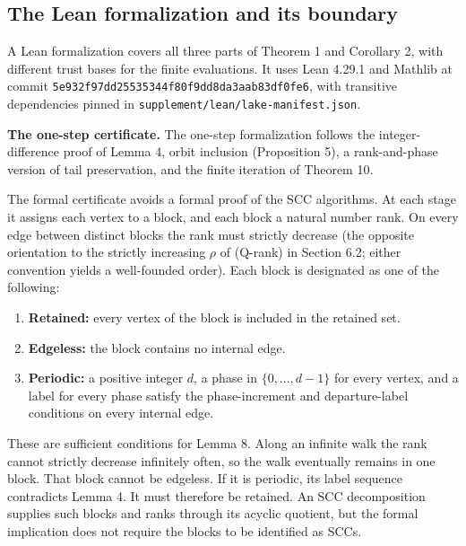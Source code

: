 \documentclass[11pt,reqno]{amsart}
\theoremstyle{definition}
\theoremstyle{remark}
\providecommand{\tightlist}{\setlength{\itemsep}{0pt}\setlength{\parskip}{0pt}}
\begin{document}
\subsection{The Lean formalization and its boundary}\label{sec:9.4}

A Lean formalization covers all three parts of Theorem 1 and Corollary 2,
with different trust bases for the finite evaluations. It uses
Lean 4.29.1 and Mathlib at commit
\nolinkurl{5e932f97dd25535344f80f9dd8da3aab83df0fe6}, with transitive dependencies
pinned in \nolinkurl{supplement/lean/lake-manifest.json}.

\textbf{The one-step certificate.} The one-step formalization follows the
integer-difference proof of Lemma 4, orbit inclusion (Proposition 5), a
rank-and-phase version of tail preservation, and the finite iteration of
Theorem 10.

The formal certificate avoids a formal proof of the SCC algorithms. At
each stage it assigns each vertex to a block, and each block a natural
number rank. On every edge between distinct blocks the rank must strictly
decrease (the opposite orientation to the strictly increasing \(\rho\) of
(Q-rank) in Section 6.2; either convention yields a well-founded order).
Each block is designated as one of the following:

\begin{enumerate}
\def\labelenumi{\arabic{enumi}.}
\tightlist
\item
  \textbf{Retained:} every vertex of the block is included in the retained set.
\item
  \textbf{Edgeless:} the block contains no internal edge.
\item
  \textbf{Periodic:} a positive integer \(d\), a phase in
  \(\{0,\ldots,d-1\}\) for every vertex, and a label for every phase
  satisfy the phase-increment and departure-label conditions on every
  internal edge.
\end{enumerate}

These are sufficient conditions for Lemma 8. Along an infinite walk the
rank cannot strictly decrease infinitely often, so the walk eventually
remains in one block. That block cannot be edgeless. If it is periodic,
its label sequence contradicts Lemma 4. It must therefore be retained.
An SCC decomposition supplies such blocks and ranks through its acyclic
quotient, but the formal implication does not require the blocks to be
identified as SCCs.
\end{document}

